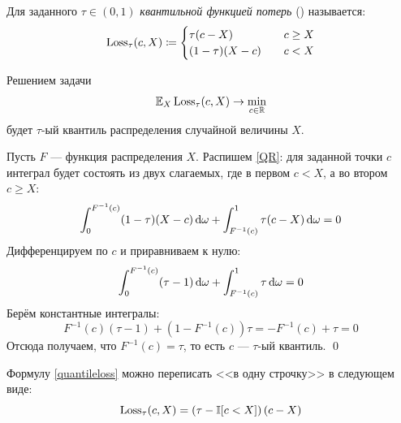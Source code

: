 \begin{definition}
Для заданного $\tau \in (0, 1)$ \emph{квантильной функцией потерь} () называется:
\begin{equation}\label{quantileloss}
\operatorname{Loss}_{\tau}(c, X) \coloneqq \begin{cases}
\tau (c - X) \quad &c \ge X \\
(1 - \tau) (X - c) \quad &c < X \\
\end{cases}
\end{equation}
\end{definition}

\begin{theorem} Решением задачи
\begin{equation}\label{QR}
\mathbb{E}_X \operatorname{Loss}_{\tau}(c, X) \to \min_{c \in \mathbb{R}}
\end{equation}
будет $\tau$-ый квантиль распределения случайной величины $X$.

\beginproof
Пусть $F$ --- функция распределения $X$. Распишем \eqref{QR}: для заданной точки $c$ интеграл будет состоять из двух слагаемых, где в первом $c < X$, а во втором $c \ge X$:
\begin{equation*}
\int_0^{F^{-1}(c)} (1 - \tau)(X - c) \mathop{}\!\mathrm{d} \omega + \int_{F^{-1}(c)}^1 \tau (c - X) \mathop{}\!\mathrm{d} \omega = 0 
\end{equation*}
Дифференцируем по $c$ и приравниваем к нулю:
\begin{equation*}
\int_0^{F^{-1}(c)} (\tau - 1) \mathop{}\!\mathrm{d} \omega + \int_{F^{-1}(c)}^1 \tau \mathop{}\!\mathrm{d} \omega = 0 
\end{equation*}
Берём константные интегралы:
\begin{equation*}
F^{-1}(c)(\tau - 1) + (1 - F^{-1}(c)) \tau = -F^{-1}(c) + \tau = 0
\end{equation*}
Отсюда получаем, что $F^{-1}(c) = \tau$, то есть $c$ --- $\tau$-ый квантиль. \qed
\end{theorem}

\begin{proposition}
Формулу \eqref{quantileloss} можно переписать <<в одну строчку>> в следующем виде:
$$\operatorname{Loss}_{\tau}(c, X) = \left( \tau - \mathbb{I}[c < X] \right) \left( c - X \right)$$
\end{proposition}

